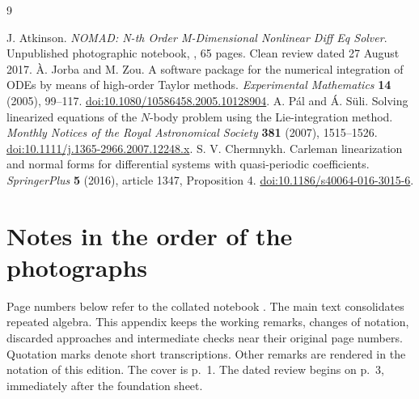 \documentclass[11pt,letterpaper]{article}
\newif\ifnotebooknotes
\newcommand{\file}[1]{\texttt{\detokenize{#1}}}
\begin{document}
\begin{thebibliography}{9}
\raggedright
{}
J. Atkinson. \emph{NOMAD: N-th Order M-Dimensional Nonlinear Diff Eq Solver}.
Unpublished photographic notebook, \file{NOMAD_derivation.pdf}, 65 pages.
Clean review dated 27 August 2017.
À. Jorba and M. Zou. A software package for the numerical integration of
ODEs by means of high-order Taylor methods. \emph{Experimental Mathematics}
\textbf{14} (2005), 99--117.
\href{https://doi.org/10.1080/10586458.2005.10128904}{doi:10.1080/10586458.2005.10128904}.
A. P\'al and \'A. S\"uli. Solving linearized equations of the \(N\)-body
problem using the Lie-integration method. \emph{Monthly Notices of the Royal
Astronomical Society} \textbf{381} (2007), 1515--1526.
\href{https://doi.org/10.1111/j.1365-2966.2007.12248.x}{doi:10.1111/j.1365-2966.2007.12248.x}.
S. V. Chermnykh. Carleman linearization and normal forms for differential
systems with quasi-periodic coefficients. \emph{SpringerPlus} \textbf{5}
(2016), article 1347, Proposition 4.
\href{https://doi.org/10.1186/s40064-016-3015-6}{doi:10.1186/s40064-016-3015-6}.
\end{thebibliography}

\ifnotebooknotes
\appendix
\section{Notes in the order of the photographs}\label{app:leaves}
Page numbers below refer to the collated notebook \cite{notebook}. The main
text consolidates repeated algebra. This appendix keeps the working remarks,
changes of notation, discarded approaches and intermediate checks near their
original page numbers. Quotation marks denote short transcriptions. Other
remarks are rendered in the notation of this edition. The cover is p.~1.
The dated review begins on p.~3, immediately after the foundation sheet.
\end{document}
